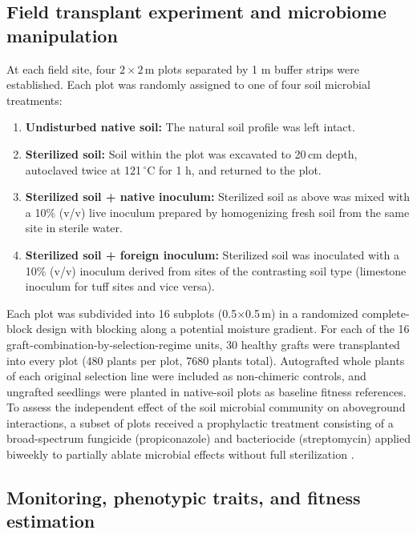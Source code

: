 \documentclass{article}
\begin{document}
\subsection{Field transplant experiment and microbiome manipulation}

At each field site, four \(2\times2\)\,m plots separated by 1 m buffer strips were established. Each plot was randomly assigned to one of four soil microbial treatments:
\begin{enumerate}
    \item \textbf{Undisturbed native soil:} The natural soil profile was left intact.
    \item \textbf{Sterilized soil:} Soil within the plot was excavated to 20\,cm depth, autoclaved twice at 121\,\(^\circ\)C for 1 h, and returned to the plot.
    \item \textbf{Sterilized soil + native inoculum:} Sterilized soil as above was mixed with a 10\% (v/v) live inoculum prepared by homogenizing fresh soil from the same site in sterile water.
    \item \textbf{Sterilized soil + foreign inoculum:} Sterilized soil was inoculated with a 10\% (v/v) inoculum derived from sites of the contrasting soil type (limestone inoculum for tuff sites and vice versa).
\end{enumerate}
Each plot was subdivided into 16 subplots (0.5\(\times\)0.5\,m) in a randomized complete-block design with blocking along a potential moisture gradient. For each of the 16 graft-combination-by-selection-regime units, 30 healthy grafts were transplanted into every plot (480 plants per plot, 7680 plants total). Autografted whole plants of each original selection line were included as non-chimeric controls, and ungrafted seedlings were planted in native-soil plots as baseline fitness references. To assess the independent effect of the soil microbial community on aboveground interactions, a subset of plots received a prophylactic treatment consisting of a broad-spectrum fungicide (propiconazole) and bacteriocide (streptomycin) applied biweekly to partially ablate microbial effects without full sterilization \citep[ablation control; see][]{berendsen2018}.

\subsection{Monitoring, phenotypic traits, and fitness estimation}
\end{document}
